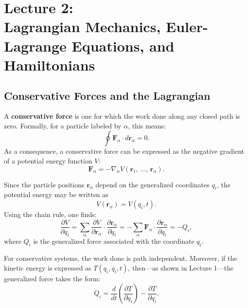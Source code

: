 \section[Lecture 2: Lagrangian Mechanics, Euler-Lagrange Equations, and Hamiltonians]
 {\texorpdfstring{Lecture 2:\\ Lagrangian Mechanics, Euler-Lagrange Equations, and Hamiltonians}
  {Lecture 2: Lagrangian Mechanics, Euler-Lagrange Equations, and Hamiltonians}}

\subsection{Conservative Forces and the Lagrangian}

A \textbf{conservative force} is one for which the work done along any closed path is zero. Formally, for a particle labeled by $\alpha$, this means:
\begin{equation}
    \oint \mathbf{F}_\alpha \cdot d\mathbf{r}_\alpha = 0.
\end{equation}
As a consequence, a conservative force can be expressed as the negative gradient of a potential energy function $V$:
\begin{equation}
    \mathbf{F}_\alpha = -\nabla_\alpha V(\mathbf{r}_1,\, \dots,\, \mathbf{r}_\alpha).
\end{equation}

Since the particle positions $\mathbf{r}_\alpha$ depend on the generalized coordinates $q_i$, the potential energy may be written as
\begin{equation}
    V(\mathbf{r}_\alpha) = V(q_i, t).
\end{equation}
Using the chain rule, one finds:
\begin{equation}
    \frac{\partial V}{\partial q_i} = \sum_\alpha \frac{\partial V}{\partial \mathbf{r}_\alpha} \cdot \frac{\partial \mathbf{r}_\alpha}{\partial q_i} = -\sum_\alpha \mathbf{F}_\alpha \cdot \frac{\partial \mathbf{r}_\alpha}{\partial q_i} = -Q_i,
\end{equation}
where $Q_i$ is the generalized force associated with the coordinate $q_i$.

For conservative systems, the work done is path independent. Moreover, if the kinetic energy is expressed as $T(q_i, \dot{q}_i, t)$, then—as shown in Lecture 1—the generalized force takes the form:
\begin{equation}
    Q_i = \frac{d}{dt}\left(\frac{\partial T}{\partial \dot{q}_i}\right) - \frac{\partial T}{\partial q_i}.
\end{equation}

